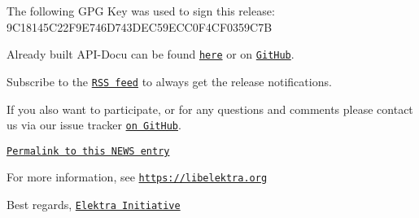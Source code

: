 The following G\+PG Key was used to sign this release\+: 9\+C18145\+C22\+F9\+E746\+D743\+D\+E\+C59\+E\+C\+C0\+F4\+C\+F0359\+C7B

Already built A\+P\+I-\/\+Docu can be found \href{https://doc.libelektra.org/api/0.9.<<VERSION>>/html/}{\tt here} or on \href{https://github.com/ElektraInitiative/doc/tree/master/api/0.9.<<VERSION>}{\tt Git\+Hub}.

Subscribe to the \href{https://www.libelektra.org/news/feed.rss}{\tt R\+SS feed} to always get the release notifications.

If you also want to participate, or for any questions and comments please contact us via our issue tracker \href{http://issues.libelektra.org}{\tt on Git\+Hub}.

\href{https://www.libelektra.org/news/0.9.<<VERSION>>-release}{\tt Permalink to this N\+E\+WS entry}

For more information, see \href{https://libelektra.org}{\tt https\+://libelektra.\+org}

Best regards, \href{https://www.libelektra.org/developers/authors}{\tt Elektra Initiative} 